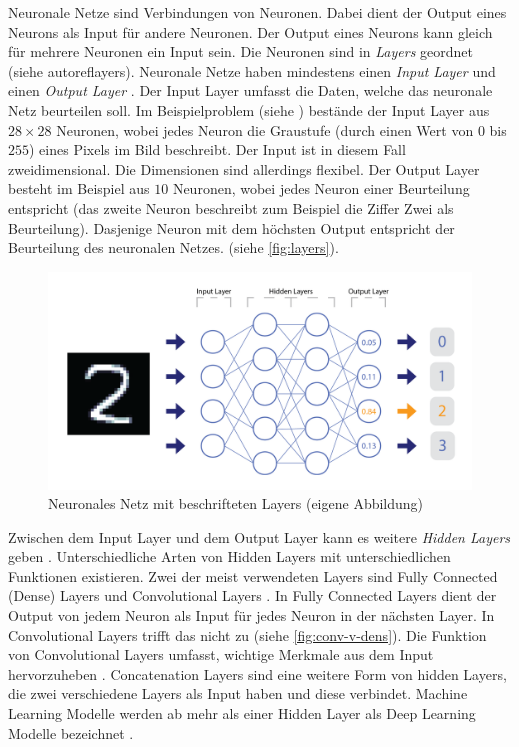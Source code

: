 Neuronale Netze sind Verbindungen von Neuronen. Dabei dient der Output eines
Neurons als Input für andere Neuronen. Der Output eines Neurons kann gleich
für mehrere Neuronen ein Input sein. Die Neuronen sind in \emph{Layers} geordnet
(siehe autoref{layers}). Neuronale Netze haben mindestens einen \emph{Input
Layer} und einen \emph{Output Layer}
\cite{nielsen_neural_2015}\cite{ognjanovski_everything_2020}. Der Input Layer
umfasst die Daten, welche das neuronale Netz beurteilen soll. Im
Beispielproblem (siehe ) bestände der Input Layer aus
$28\times28$ Neuronen, wobei jedes Neuron die Graustufe (durch einen Wert von
$0$ bis $255$) eines Pixels im Bild beschreibt. Der Input ist in diesem Fall
zweidimensional. Die Dimensionen sind allerdings flexibel. Der Output Layer
besteht im Beispiel aus $10$ Neuronen, wobei jedes Neuron einer Beurteilung
entspricht (das zweite Neuron beschreibt zum Beispiel die Ziffer Zwei als
Beurteilung). Dasjenige Neuron mit dem höchsten Output entspricht der
Beurteilung des neuronalen Netzes. (siehe \autoref{fig:layers}).

\begin{figure}[!ht]
    \centering
    \includegraphics[width=\textwidth]{images/theorie/layers.png}
    \caption{Neuronales Netz mit beschrifteten Layers (eigene Abbildung)}
    \label{fig:layers}
\end{figure}

Zwischen dem Input Layer und dem Output Layer kann es weitere \emph{Hidden
Layers} geben \cite{malik_what_2019}. Unterschiedliche Arten von Hidden Layers
mit unterschiedlichen Funktionen existieren. Zwei der meist verwendeten Layers
sind Fully Connected (Dense) Layers und Convolutional Layers
\cite{unzueta_convolutional_2022}. In Fully Connected Layers dient der Output
von jedem Neuron als Input für jedes Neuron in der nächsten Layer. In
Convolutional Layers trifft das nicht zu (siehe \autoref{fig:conv-v-dens}). Die
Funktion von Convolutional Layers umfasst, wichtige Merkmale aus dem Input
hervorzuheben \cite{deshpande_beginners_nodate}. Concatenation Layers
\cite{jayawardana_concatenating_2021} sind eine weitere Form von hidden Layers,
die zwei verschiedene Layers als Input haben und diese verbindet. Machine
Learning Modelle werden ab mehr als einer Hidden Layer als Deep Learning Modelle
bezeichnet \cite{jan-dirk_kranz_deep_2019}.

